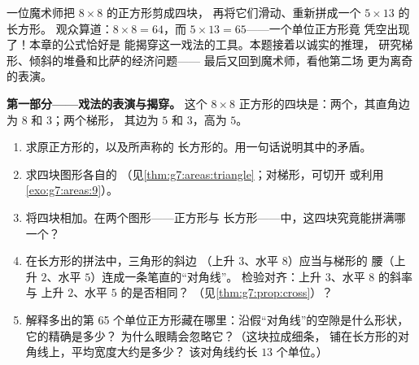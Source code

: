 \begin{problem}[{周末问题——一个著名的“证明”声称
$64 = 65$，借面积与斜率揭穿，
并以比萨与圆环作甜点}]
\label{pb:g7:areas:1}
一位魔术师把 $8 \times 8$ 的正方形剪成四块，
再将它们滑动、重新拼成一个 $5 \times 13$ 的长方形。
观众算道：$8 \times 8 = 64$，而
$5 \times 13 = 65$——一个单位正方形竟
凭空出现了！本章的公式恰好是
能揭穿这一戏法的工具。本题接着以诚实的推理，
研究梯形、倾斜的堆叠和比萨的经济问题——
最后又回到魔术师，看他第二场
更为离奇的表演。

\medskip
\noindent\textbf{第一部分——戏法的表演与揭穿。}
这个 $8 \times 8$ 正方形的四块是：两个，其直角边为 $8$ 和 $3$；两个梯形，
其边为 $5$ 和 $3$，高为 $5$。
\begin{enumerate}
  \item 求原正方形的，以及所声称的
        长方形的。用一句话说明其中的矛盾。
  \item 求四块图形各自的
        （见\cref{thm:g7:areas:triangle}；对梯形，可切开
        或利用\cref{exo:g7:areas:9}）。
  \item 将四块相加。在两个图形——正方形与
        长方形——中，这四块究竟能拼满哪一个？
  \item 在长方形的拼法中，三角形的斜边
        （上升 $3$、水平 $8$）应当与梯形的
        腰（上升 $2$、水平 $5$）连成一条笔直的“对角线”。
        检验对齐：上升 $3$、水平 $8$ 的斜率与
        上升 $2$、水平 $5$ 的是否相同？
        （见\cref{thm:g7:prop:cross}）？
  \item 解释多出的第 65 个单位正方形藏在哪里：沿假“对角线”的空隙是什么形状，
        它的精确是多少？
        为什么眼睛会忽略它？（这块拉成细条，
        铺在长方形的对角线上，平均宽度大约是多少？
        该对角线约长 $13$ 个单位。）
\end{enumerate}


\end{problem}
